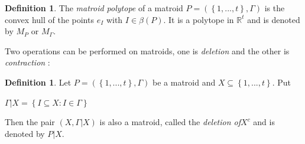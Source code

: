 \documentclass[12pt, reqno]{amsart}
\theoremstyle{definition}
\newtheorem{definition}[theorem]{Definition}
\theoremstyle{remark}
\numberwithin{equation}{section}
\begin{document}






\begin{definition}
	The \emph{matroid polytope} of a matroid $P=(\left\{1,...,t\right\},\varGamma)$ is the convex hull of the points $e_I$ with $I\in \beta(P)$. It is a polytope in $\mathbb{R}^t$ and is denoted by $M_P$ or $M_\Gamma$. 
\end{definition}




Two operations can be performed on matroids, one is \emph{deletion} and the other is \emph{contraction} :

\begin{definition}\label{del}
	Let $P=(\left\{1,...,t\right\},\varGamma)$ be a matroid and $X\subseteq \left\{1,...,t\right\}$. Put 
	\begin{center}
		$\varGamma|X=\left\{ I\subseteq X: I\in \varGamma\right\}$
	\end{center}
	
	Then the pair 
	$(X,\varGamma|X)$ is also a matroid, called the \emph{deletion of}$X^c$  and is denoted by $P|X$.
	
\end{definition}
\end{document}
